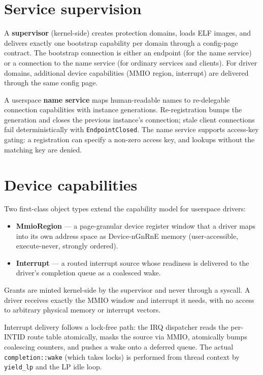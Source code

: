 \section{Service supervision}

A \textbf{supervisor} (kernel-side) creates protection domains, loads ELF
images, and delivers exactly one bootstrap capability per domain through a
config-page contract. The bootstrap connection is either an endpoint (for the
name service) or a connection to the name service (for ordinary services and
clients). For driver domains, additional device capabilities (MMIO region,
interrupt) are delivered through the same config page.

A userspace \textbf{name service} maps human-readable names to
re-delegable connection capabilities with instance generations. Re-registration
bumps the generation and closes the previous instance's connection; stale client
connections fail deterministically with \texttt{EndpointClosed}. The name
service supports access-key gating: a registration can specify a non-zero
access key, and lookups without the matching key are denied.

\section{Device capabilities}

Two first-class object types extend the capability model for userspace drivers:

\begin{itemize}
    \item \textbf{MmioRegion} --- a page-granular device register window that a
        driver maps into its own address space as Device-nGnRnE memory
        (user-accessible, execute-never, strongly ordered).
    \item \textbf{Interrupt} --- a routed interrupt source whose readiness is
        delivered to the driver's completion queue as a coalesced wake.
\end{itemize}

Grants are minted kernel-side by the supervisor and never through a syscall. A
driver receives exactly the MMIO window and interrupt it needs, with no access
to arbitrary physical memory or interrupt vectors.

Interrupt delivery follows a lock-free path: the IRQ dispatcher reads the
per-INTID route table atomically, masks the source via MMIO, atomically bumps
coalescing counters, and pushes a wake onto a deferred queue. The actual
\texttt{completion::wake} (which takes locks) is performed from thread context
by \texttt{yield\_lp} and the LP idle loop.

